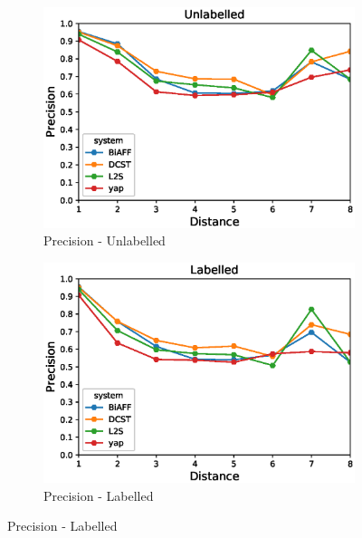 \documentclass[11pt]{article}
\begin{document}
    



\begin{figure}[!ht]
        \centering
        \begin{subfigure}[b]{0.475\textwidth}
            \centering
            \includegraphics[width=\textwidth]{images/TestUnlabelledPrecisionDistRoot.eps}
            \caption[Network2]%
            {{\small Precision - Unlabelled}}    
            
        \end{subfigure}
        \hfill
        \begin{subfigure}[b]{0.475\textwidth}  
            \centering 
            \includegraphics[width=\textwidth]{images/TestLabelledPrecisionDistRoot.eps}
            \caption[]%
            {{\small Precision - Labelled}}    
            

\end{subfigure}
\end{figure}
\end{document}
